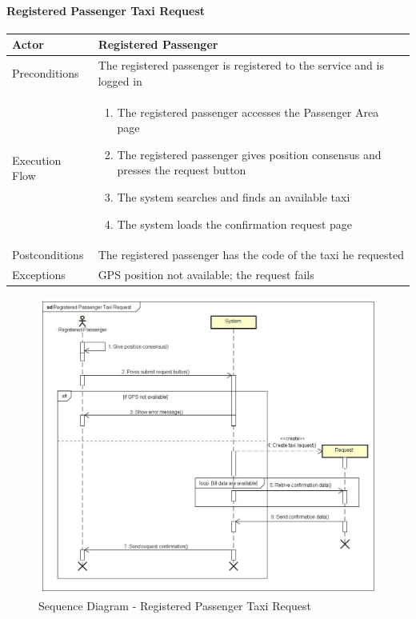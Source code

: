 \paragraph{Registered Passenger Taxi Request}
\begin{center}
	\begin{tabular}{ | l | p{8cm} |}
		\hline
		Actor &  Registered Passenger	\\ \hline
		Preconditions & The registered passenger is registered to the service and is logged in	\\ \hline
		Execution Flow & \begin{enumerate}
			\item The registered passenger accesses the Passenger Area page
			\item The registered passenger gives position consensus and presses the request button
			\item The system searches and finds an available taxi
			\item The system loads the confirmation request page
		\end{enumerate}		\\ \hline
		Postconditions & The registered passenger has the code of the taxi he requested	\\ \hline
		Exceptions & GPS position not available; the request fails \\ \hline
	\end{tabular}
\end{center}
\newpage
\begin{landscape}
\begin{figure}[!h]
	\begin{center}			
		\includegraphics[height=\textheight]{../SE2_SD/RegisteredPassengerTaxiRequest}
		\caption{Sequence Diagram - Registered Passenger Taxi Request}	
	\end{center}
\end{figure}
\end{landscape}
\newpage

